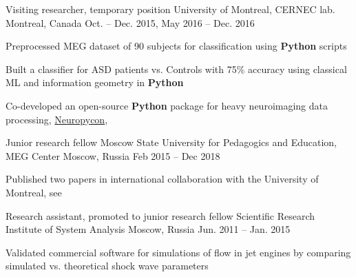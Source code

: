 \begin{cventries}
    {Visiting researcher, temporary position}
    {University of Montreal, CERNEC lab.}
    {Montreal, Canada}
    {Oct. -- Dec. 2015, May 2016 -- Dec. 2016}
    {
      \begin{cvitems}
      \item {Preprocessed MEG dataset of 90 subjects for classification using \textbf{Python} scripts}
      \item{Built a classifier for ASD patients vs. Controls with 75\% accuracy using classical ML and information geometry in \textbf{Python}}
          \item{Co-developed an open-source \textbf{Python} package for heavy neuroimaging data processing, \href{https://github.com/neuropycon}{Neuropycon}, \cite{Neuropycon}}
      \end{cvitems}
    }
  \cventry
    {Junior research fellow}
    {Moscow State University for Pedagogics and Education, MEG Center}
    {Moscow, Russia}
    {Feb 2015 -- Dec 2018}
    {
      \begin{cvitems}
      \item{Published two papers in international collaboration with the University of Montreal, see \cite{Alamian2017a, Alamian2017b}}
      \end{cvitems}
    }
  \cventry
    {Research assistant, promoted to junior research fellow}
    {Scientific Research Institute of System Analysis}
    {Moscow, Russia}
    {Jun. 2011 -- Jan. 2015}
    {
      \begin{cvitems}
        \item{Validated commercial software for simulations of flow in jet engines by comparing simulated vs. theoretical shock wave parameters}
      \end{cvitems}
    }
\end{cventries}
